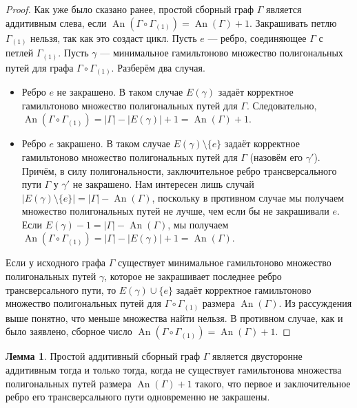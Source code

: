 \documentclass{article}
\theoremstyle{definition}
\newtheorem{lemma}[theorem]{Лемма}
\newcommand{\An}{\operatorname{An}}
\begin{document}
\begin{proof}
    Как уже было сказано ранее, простой сборный граф $\Gamma$ является аддитивным слева, если $\An(\Gamma\circ \Gamma_{(1)}) = \An(\Gamma) + 1$. Закрашивать петлю $\Gamma_{(1)}$ нельзя, так как это создаст цикл. Пусть $e$ — ребро, соединяющее $\Gamma$ с петлей $\Gamma_{(1)}$. Пусть $\gamma$ — минимальное гамильтоново множество полигональных путей для графа $\Gamma\circ \Gamma_{(1)}$. Разберём два случая.

    \begin{itemize}
        \item Ребро $e$ не закрашено. В таком случае $E(\gamma)$ задаёт корректное гамильтоново множество полигональных путей для $\Gamma$. Следовательно, $\An(\Gamma\circ\Gamma_{(1)}) = |\Gamma| - |E(\gamma)| + 1 = \An(\Gamma) + 1$.
        \item Ребро $e$ закрашено. В таком случае $E(\gamma) \setminus \{e\}$ задаёт корректное гамильтоново множество полигональных путей для $\Gamma$ (назовём его $\gamma'$). Причём, в силу полигональности, заключительное ребро трансверсального пути $\Gamma$ у $\gamma'$ не закрашено. Нам интересен лишь случай $|E(\gamma)\setminus \{e\}| = |\Gamma| - \An(\Gamma)$, поскольку в противном случае мы получаем множество полигональных путей не лучше, чем если бы не закрашивали $e$. Если $E(\gamma) - 1 = |\Gamma| - \An(\Gamma)$, мы получаем $\An(\Gamma\circ\Gamma_{(1)}) = |\Gamma| - |E(\gamma)| + 1 = \An(\Gamma)$.
    \end{itemize}

    Если у исходного графа $\Gamma$ существует минимальное гамильтоново множество полигональных путей $\gamma$, которое не закрашивает последнее ребро трансверсального пути, то $E(\gamma) \cup \{e\}$ задаёт корректное гамильтоново множество полигональных путей для $\Gamma\circ \Gamma_{(1)}$ размера $\An(\Gamma)$. Из рассуждения выше понятно, что меньше множества найти нельзя. В противном случае, как и было заявлено, сборное число $\An(\Gamma\circ \Gamma_{(1)}) = \An(\Gamma) + 1$.
\end{proof}

\begin{lemma}\label{lemma:middle-additive}
    Простой аддитивный сборный граф $\Gamma$ является двусторонне аддитивным тогда и только тогда, когда не существует гамильтонова множества полигональных путей размера $\An(\Gamma) + 1$ такого, что первое и заключительное ребро его трансверсального пути одновременно не закрашены.
\end{lemma}
\end{document}

